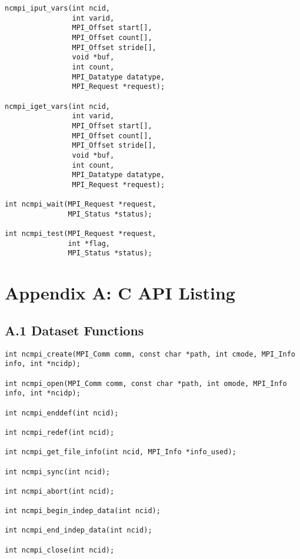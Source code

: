 \documentclass[10pt]{article}
\begin{document}
\begin{verbatim}
ncmpi_iput_vars(int ncid,
                int varid,
                MPI_Offset start[],
                MPI_Offset count[],
                MPI_Offset stride[],
                void *buf,
                int count,
                MPI_Datatype datatype,
                MPI_Request *request);

ncmpi_iget_vars(int ncid,
                int varid,
                MPI_Offset start[],
                MPI_Offset count[],
                MPI_Offset stride[],
                void *buf,
                int count,
                MPI_Datatype datatype,
                MPI_Request *request);

int ncmpi_wait(MPI_Request *request, 
               MPI_Status *status);

int ncmpi_test(MPI_Request *request,
               int *flag,
               MPI_Status *status);
\end{verbatim}

%
%



%
%
\section*{Appendix A: C API Listing}

%
%
\subsection*{A.1  Dataset Functions}

\begin{verbatim}
int ncmpi_create(MPI_Comm comm, const char *path, int cmode, MPI_Info info, int *ncidp);

int ncmpi_open(MPI_Comm comm, const char *path, int omode, MPI_Info info, int *ncidp);

int ncmpi_enddef(int ncid);

int ncmpi_redef(int ncid);

int ncmpi_get_file_info(int ncid, MPI_Info *info_used);

int ncmpi_sync(int ncid);

int ncmpi_abort(int ncid);

int ncmpi_begin_indep_data(int ncid);

int ncmpi_end_indep_data(int ncid);

int ncmpi_close(int ncid);
\end{verbatim}
\end{document}
